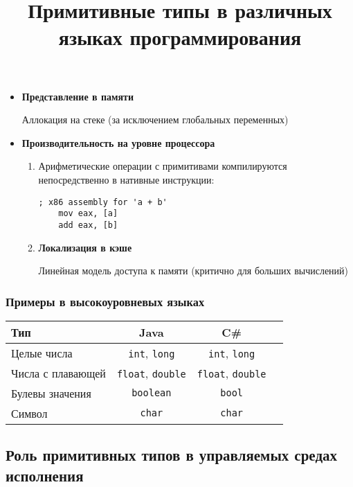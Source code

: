 \begin{itemize}
    \item \textbf{Представление в памяти}
    \begin{itemize}
        {Аллокация на стеке} (за исключением глобальных переменных)
    \end{itemize}
    \item \textbf{Производительность на уровне процессора}
    \begin{enumerate}
        \item

        Арифметические операции с примитивами компилируются непосредственно в нативные инструкции:

        \begin{lstlisting}[language={[x86masm]Assembler}]
    ; x86 assembly for 'a + b'
    mov eax, [a]
    add eax, [b]\end{lstlisting}

        \item \textbf{Локализация в кэше}

        Линейная модель доступа к памяти (критично для больших вычислений)
    \end{enumerate}
\end{itemize}

\subsubsection{Примеры в высокоуровневых языках}

\begin{table}[h]
    \centering
    \title{Примитивные типы в различных языках программирования}
    \begin{tabular}{lccc}
        \toprule
        \textbf{Тип} & \textbf{Java} & \textbf{C\#}  \\
        \midrule
        Целые числа & \texttt{int}, \texttt{long} & \texttt{int}, \texttt{long} \\
        Числа с плавающей & \texttt{float}, \texttt{double} & \texttt{float}, \texttt{double}  \\
        Булевы значения & \texttt{boolean} & \texttt{bool} \\
        Символ & \texttt{char} & \texttt{char} \\
        \bottomrule
    \end{tabular}
\end{table}

\newpage

\subsection{Роль примитивных типов в управляемых средах исполнения}


